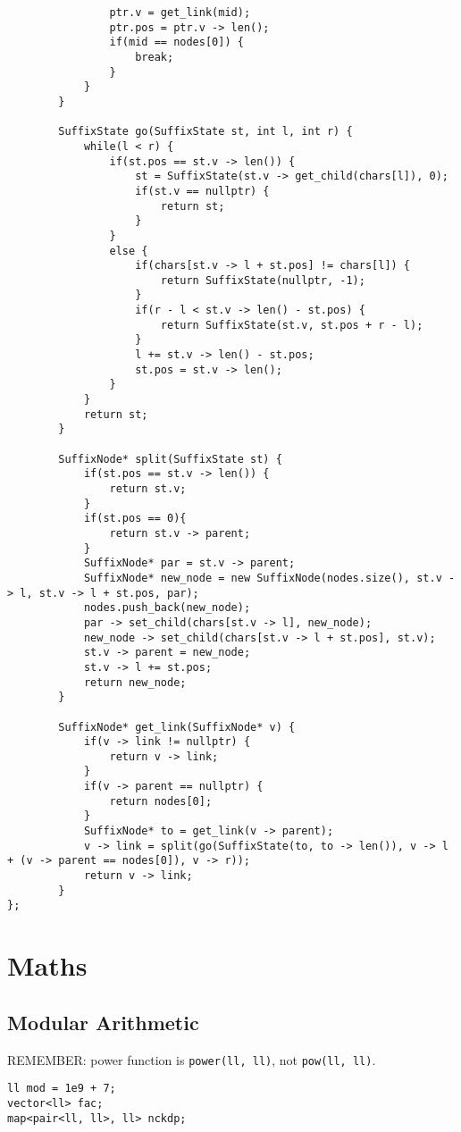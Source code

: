 \documentclass[8pt, headheight=10pt]{scrartcl}
\begin{document}
\begin{multicols*}{3}
\begin{lstlisting}
                ptr.v = get_link(mid);
                ptr.pos = ptr.v -> len();
                if(mid == nodes[0]) {
                    break;
                }
            }
        }

        SuffixState go(SuffixState st, int l, int r) {
            while(l < r) {
                if(st.pos == st.v -> len()) {
                    st = SuffixState(st.v -> get_child(chars[l]), 0);
                    if(st.v == nullptr) {
                        return st;
                    }
                }
                else {
                    if(chars[st.v -> l + st.pos] != chars[l]) {
                        return SuffixState(nullptr, -1);
                    }
                    if(r - l < st.v -> len() - st.pos) {
                        return SuffixState(st.v, st.pos + r - l);
                    }
                    l += st.v -> len() - st.pos;
                    st.pos = st.v -> len();
                }
            }
            return st;
        }

        SuffixNode* split(SuffixState st) {
            if(st.pos == st.v -> len()) {
                return st.v;
            }
            if(st.pos == 0){
                return st.v -> parent;
            }
            SuffixNode* par = st.v -> parent;
            SuffixNode* new_node = new SuffixNode(nodes.size(), st.v -> l, st.v -> l + st.pos, par);
            nodes.push_back(new_node);
            par -> set_child(chars[st.v -> l], new_node);
            new_node -> set_child(chars[st.v -> l + st.pos], st.v);
            st.v -> parent = new_node;
            st.v -> l += st.pos;
            return new_node;
        }

        SuffixNode* get_link(SuffixNode* v) {
            if(v -> link != nullptr) {
                return v -> link;
            }
            if(v -> parent == nullptr) {
                return nodes[0];
            }
            SuffixNode* to = get_link(v -> parent);
            v -> link = split(go(SuffixState(to, to -> len()), v -> l + (v -> parent == nodes[0]), v -> r));
            return v -> link;
        }
};
\end{lstlisting}

\section{Maths}
\subsection{Modular Arithmetic}
REMEMBER: power function is \lstinline{power(ll, ll)}, not \lstinline{pow(ll, ll)}.
\begin{lstlisting}
ll mod = 1e9 + 7;
vector<ll> fac;
map<pair<ll, ll>, ll> nckdp;


\end{lstlisting}
\end{multicols*}
\end{document}
